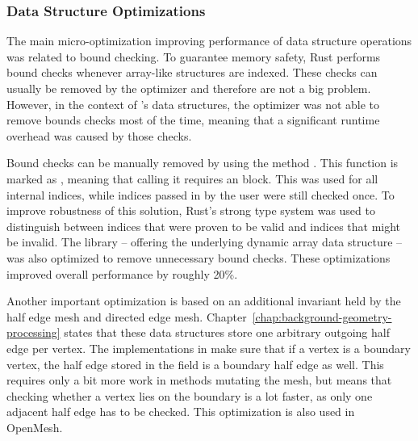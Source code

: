 \vspace{-1mm}
\subsubsection*{Data Structure Optimizations}

The main micro-optimization improving performance of data structure operations was related to bound checking.
To guarantee memory safety, Rust performs bound checks whenever array-like structures are indexed.
These checks can usually be removed by the optimizer and therefore are not a big problem.
However, in the context of 's data structures, the optimizer was not able to remove bounds checks most of the time, meaning that a significant runtime overhead was caused by those checks.

Bound checks can be manually removed by using the method .
This function is marked as , meaning that calling it requires an  block.
This was used for all internal indices, while indices passed in by the user were still checked once.
To improve robustness of this solution, Rust's strong type system was used to distinguish between indices that were proven to be valid and indices that might be invalid.
The library  -- offering the underlying dynamic array data structure -- was also optimized to remove unnecessary bound checks.
These optimizations improved overall performance by roughly 20\%.

Another important optimization is based on an additional invariant held by the half edge mesh and directed edge mesh.
Chapter~\ref{chap:background-geometry-processing} states that these data structures store one arbitrary outgoing half edge per vertex.
The implementations in  make sure that if a vertex is a boundary vertex, the half edge stored in the  field is a boundary half edge as well.
This requires only a bit more work in methods mutating the mesh, but means that checking whether a vertex lies on the boundary is a lot faster, as only one adjacent half edge has to be checked.
This optimization is also used in OpenMesh.
